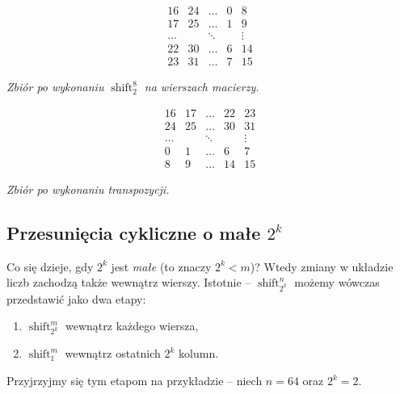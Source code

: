 \documentclass[a4paper]{article}
\newcommand{\shift}[2]{\operatorname{shift}_{#2}^{#1}}
\theoremstyle{definition}
\begin{document}
\begin{minipage}{.5\textwidth} %
\[
\begin{matrix}
 16 &  24 &  \ldots & 0 & 8 \\
 17 &  25 &  \ldots & 1 & 9 \\
\ldots  & &  \ddots &   & \vdots \\
 22 &  30 &  \ldots & 6 & 14 \\
 23 &  31 &  \ldots & 7 & 15
\end{matrix}
\]

\begin{center} \it
    Zbiór po wykonaniu \(\shift{8}{2}\) na wierszach macierzy.
\end{center}

\end{minipage} %
\begin{minipage}{.5\textwidth} %

\[
\begin{matrix}
 16 &  17 &  \ldots & 22 & 23 \\
 24 &  25 &  \ldots & 30 & 31 \\
\ldots  & &  \ddots &    & \vdots \\
  0 &   1 &  \ldots &  6 & 7 \\
  8 &   9 &  \ldots &  14 & 15
\end{matrix}
\]

\begin{center} \it
    Zbiór po wykonaniu transpozycji.
\end{center}
\end{minipage}

\subsection{Przesunięcia cykliczne o małe \(2^k\)}

Co się dzieje, gdy \(2^k\) jest \textit{małe} (to znaczy \(2^k < m \))? Wtedy zmiany w układzie liczb zachodzą także wewnątrz wierszy. Istotnie -- \(\shift n {2^k}\) możemy wówczas przedstawić jako dwa etapy:
\begin{enumerate}
    \item \(\shift{m}{2^k}\) wewnątrz każdego wiersza,
    \item \(\shift{m}{1}\) wewnątrz ostatnich \(2^k\) kolumn.
\end{enumerate}

Przyjrzyjmy się tym etapom na przykładzie -- niech \(n=64\) oraz \(2^k = 2\).

\vspace{0.5em}
\end{document}
